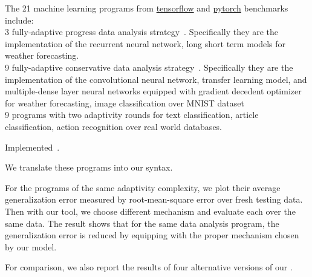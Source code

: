 The 21 machine learning programs
from \hyperlink{https://github.com/tensorflow/tensorflow/tree/master/tensorflow/examples}{tensorflow}
and \hyperlink{https://github.com/pytorch/pytorch}{pytorch}
benchmarks include:
\\
3 fully-adaptive progress data analysis
strategy~\cite{ZrnicH19}.
Specifically they are the implementation of the recurrent neural network, long short term models for 
weather forecasting.
\\
9
fully-adaptive conservative data analysis
strategy~\cite{ZrnicH19}.
Specifically they are the implementation of the convolutional neural network, transfer learning model,
and multiple-dense layer neural networks equipped with gradient decedent optimizer for
weather forecasting, image classification over MNIST dataset
\\
9 programs with two adaptivity rounds for text classification,
article classification, action recognition over real world databases.


Implemented~\cite{Jamieson2015TheAO}.

We translate these programs into our syntax.

For the programs of the same adaptivity complexity, we plot their average generalization error measured by root-mean-square error over fresh testing data.
Then with our tool, we choose different mechanism and evaluate each over the same data.
The result shows that for the same data analysis program, the generalization error is reduced
by equipping with the proper mechanism chosen by our model.


For comparison, we also report the results of 
four alternative versions of our \THESYSTEM.


